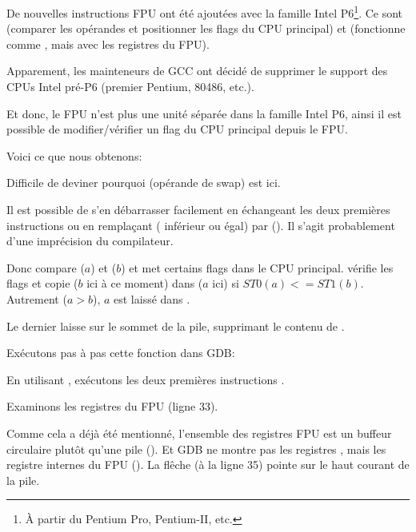 \label{gcc481_o3}

De nouvelles instructions FPU ont été ajoutées avec la famille Intel P6\footnote{À partir du Pentium Pro, Pentium-II, etc.}.
Ce sont  (comparer les opérandes et positionner les flags du CPU principal)
et 
 (fonctionne comme , mais avec les registres du FPU).

Apparement, les mainteneurs de GCC ont décidé de supprimer le support des CPUs Intel
pré-P6 (premier Pentium, 80486, etc.).

Et donc, le FPU n'est plus une unité séparée dans la famille Intel P6, ainsi il est
possible de modifier/vérifier un flag du CPU principal depuis le FPU.

Voici ce que nous obtenons:



Difficile de deviner pourquoi  (opérande de swap) est ici.

Il est possible de s'en débarrasser facilement en échangeant les deux premières instructions
\FLD ou en remplaçant  ( inférieur ou égal) par
 ().
Il s'agit probablement d'une imprécision du compilateur.

Donc  compare  ($a$) et  ($b$) et met certains flags
dans le CPU principal.
 vérifie les flags et copie  ($b$ ici à ce moment) dans 
($a$ ici) si $ST0 (a) <= ST1 (b)$.
Autrement ($a>b$), $a$ est laissé dans .

Le dernier \FSTP laisse  sur le sommet de la pile, supprimant le contenu de .

Exécutons pas à pas cette fonction dans GDB:



En utilisant , exécutons les deux premières instructions \FLD.

Examinons les registres du FPU (ligne 33).

Comme cela a déjà été mentionné, l'ensemble des registres FPU est un buffeur
circulaire plutôt qu'une pile ().
Et GDB ne montre pas les registres , mais les registre internes du FPU ().
La flêche (à la ligne 35) pointe sur le haut courant de la pile.

